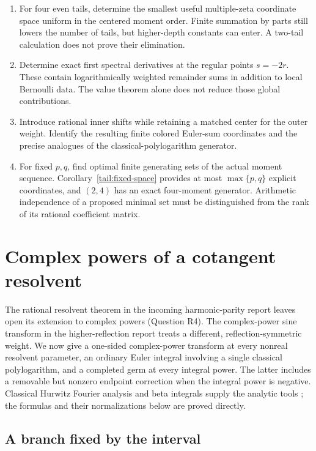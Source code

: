 \documentclass[11pt,a4paper]{article}
\numberwithin{equation}{section}
\theoremstyle{definition}
\theoremstyle{remark}
\begin{document}
\begin{enumerate}
\item For four even tails, determine the smallest useful
multiple-zeta coordinate space uniform in the centered moment
order. Finite summation by parts still lowers the number of tails,
but higher-depth constants can enter. A two-tail calculation does
not prove their elimination.
\item Determine exact first spectral derivatives at the regular
points \(s=-2r\). These contain logarithmically weighted remainder
sums in addition to local Bernoulli data. The value theorem alone
does not reduce those global contributions.
\item Introduce rational inner shifts while retaining a matched
center for the outer weight. Identify the resulting finite
colored Euler-sum coordinates and the precise analogues of the
classical-polylogarithm generator.
\item For fixed \(p,q\), find optimal finite generating sets of
the actual moment sequence. Corollary~\ref{tail:fixed-space}
provides at most \(\max\{p,q\}\) explicit coordinates, and
\((2,4)\) has an exact four-moment generator. Arithmetic
independence of a proposed minimal set must be distinguished from
the rank of its rational coefficient matrix.
\end{enumerate}




\section{Complex powers of a cotangent resolvent}
\label{power:sec}

The rational resolvent theorem in the incoming harmonic-parity report
leaves open its extension to complex powers (Question R4).  The
complex-power sine transform in the higher-reflection report treats a
different, reflection-symmetric weight.  We now give a one-sided
complex-power transform at every nonreal resolvent parameter, an ordinary
Euler integral involving a single classical polylogarithm, and a completed
germ at every integral power.  The latter includes a removable but
nonzero endpoint correction when the integral power is negative.
Classical Hurwitz Fourier analysis and beta integrals supply the analytic
tools \cite{DLMF,EspinosaMoll}; the formulas and their
normalizations below are proved directly.

\subsection{A branch fixed by the interval}
\end{document}
